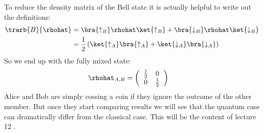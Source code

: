 To reduce the density matrix of the Bell state it is actually helpful to write out the definitions:
\begin{align}
\trarb{B}{\rhohat} &= \bra{\uparrow_B}\rhohat\ket{\uparrow_B}+\bra{\downarrow_B}\rhohat\ket{\downarrow_B}\\
&=\frac{1}{2}\left(\ket{\uparrow_A}\bra{\uparrow_A}+\ket{\downarrow_A}\bra{\downarrow_A}\right)
\end{align}
So we end up with the fully mixed state:
\begin{align}
  \rhohat_{A,B} &= \left(\begin{array}{cc}
  \frac{1}{2}&0\\
  0&\frac{1}{2}
  \end{array}\right)
\end{align}
Alice and Bob are simply cossing a coin if they ignore the outcome of the other member. But once they start comparing results we will see that the quantum case can dramatically differ from the classical case. This will be the content of lecture 12  \cite{entanglement}.